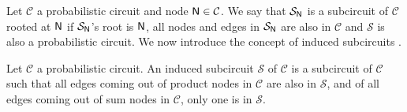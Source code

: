Let $\mathcal{C}$ a probabilistic circuit and node $\operatorname{\textsf{N}}\in\mathcal{C}$. We say that
$\mathcal{S}_{\operatorname{\textsf{N}}}$ is a subcircuit of $\mathcal{C}$ rooted at $\operatorname{\textsf{N}}$ if $\mathcal{S}_{\operatorname{\textsf{N}}}$'s
root is $\operatorname{\textsf{N}}$, all nodes and edges in $\mathcal{S}_{\operatorname{\textsf{N}}}$ are also in $\mathcal{C}$ and
$\mathcal{S}$ is also a probabilistic circuit. We now introduce the concept of induced subcircuits
\citep{chan06,dennis15,peharz14}.

\begin{definition}
  Let $\mathcal{C}$ a probabilistic circuit. An induced subcircuit $\mathcal{S}$ of $\mathcal{C}$
  is a subcircuit of $\mathcal{C}$ such that all edges coming out of product nodes in $\mathcal{C}$
  are also in $\mathcal{S}$, and of all edges coming out of sum nodes in $\mathcal{C}$, only one is
  in $\mathcal{S}$.
\end{definition}

